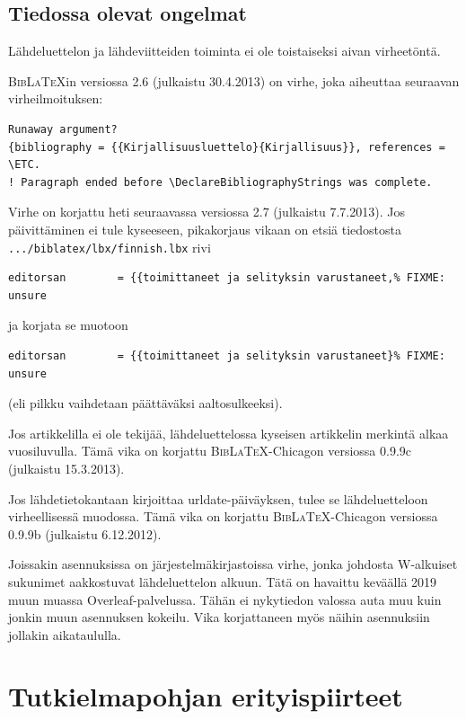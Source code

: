 \documentclass[utf8,bachelor]{gradu3}
\begin{document}
\section{Tiedossa olevat ongelmat}

Lähdeluettelon ja lähdeviitteiden toiminta ei ole toistaiseksi aivan
virheetöntä.

\textsc{Bib\LaTeX}in versiossa 2.6 (julkaistu 30.4.2013) on virhe,
joka aiheuttaa seuraavan virheilmoituksen:%
{\footnotesize%
\begin{verbatim}
Runaway argument?
{bibliography = {{Kirjallisuusluettelo}{Kirjallisuus}}, references = \ETC.
! Paragraph ended before \DeclareBibliographyStrings was complete.
\end{verbatim}
}%
Virhe on korjattu heti seuraavassa versiossa 2.7 (julkaistu 7.7.2013).
Jos päivittäminen ei tule kyseeseen, pikakorjaus vikaan on etsiä
tiedostosta \texttt{.../biblatex/lbx/finnish.lbx} rivi%
{\footnotesize%
\begin{verbatim}
editorsan        = {{toimittaneet ja selityksin varustaneet,% FIXME: unsure
\end{verbatim}
}%
ja korjata se muotoon%
{\footnotesize%
\begin{verbatim}
editorsan        = {{toimittaneet ja selityksin varustaneet}% FIXME: unsure
\end{verbatim}
}%
(eli pilkku vaihdetaan päättäväksi aaltosulkeeksi).

Jos artikkelilla ei ole tekijää, lähdeluettelossa kyseisen artikkelin
merkintä alkaa vuosiluvulla.  Tämä vika on korjattu
\textsc{Bib\LaTeX}-Chicagon versiossa 0.9.9c (julkaistu 15.3.2013).

Jos lähdetietokantaan kirjoittaa urldate-päiväyksen, tulee se
lähdeluetteloon virheellisessä muodossa.  Tämä vika on korjattu
\textsc{Bib\LaTeX}-Chicagon versiossa 0.9.9b (julkaistu 6.12.2012).

Joissakin asennuksissa on järjestelmäkirjastoissa virhe, jonka
johdosta W-alkuiset sukunimet aakkostuvat lähdeluettelon alkuun.  Tätä
on havaittu keväällä 2019 muun muassa Overleaf-palvelussa.  Tähän ei
nykytiedon valossa auta muu kuin jonkin muun asennuksen kokeilu.  Vika
korjattaneen myös näihin asennuksiin jollakin aikataululla.

\chapter{Tutkielmapohjan erityispiirteet}
\end{document}
